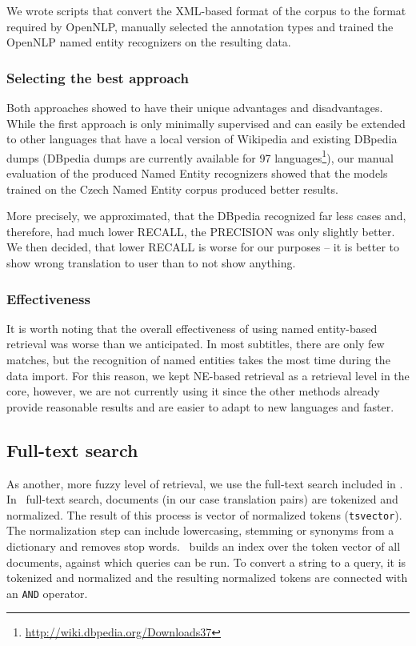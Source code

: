 We wrote scripts that convert the XML-based format of the corpus to the format required by OpenNLP, 
manually selected the annotation types and trained the OpenNLP named entity recognizers on the resulting data.


\subsubsection*{Selecting the best approach}

Both approaches showed to have their unique advantages and disadvantages. While the first approach is 
only minimally supervised and can easily be extended to other languages that have a local version of 
Wikipedia and existing DBpedia dumps (DBpedia dumps are currently available for 97 languages\footnote{\url{http://wiki.dbpedia.org/Downloads37}}), 
our manual evaluation of the produced Named Entity recognizers showed that the 
models trained on the Czech Named Entity corpus produced better results.

More precisely, we approximated, that the DBpedia recognized far less cases and, therefore, had much lower RECALL, the PRECISION was only slightly better. We then decided, that lower RECALL is worse for our purposes -- it is better to show wrong translation to user than to not show anything.

\subsubsection*{Effectiveness}
It is worth noting that the overall effectiveness of using named entity-based retrieval was worse than we anticipated. In most subtitles, there are only few matches, but the recognition of named entities takes the most time during the data import. For this reason, we kept NE-based retrieval as a retrieval level in the core, however, we are not currently using it since the other methods already provide reasonable results and are easier to adapt to new languages and faster.

\subsection{Full-text search}

As another, more fuzzy level of retrieval, we use the full-text search included in \postgres. In  \postgres~full-text search, documents (in our case translation pairs) are tokenized and normalized. The result of this process is vector of normalized tokens ({\tt tsvector}). The normalization step can include lowercasing, stemming or synonyms from a dictionary and removes stop words. \postgres~builds an index over the token vector of all documents, against which queries can be run. To convert a string to a query, it is tokenized and normalized and the resulting normalized tokens are connected with an {\tt AND} operator.

